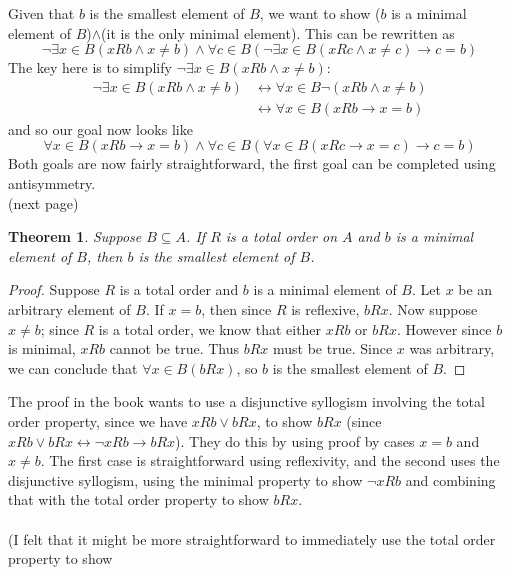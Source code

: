 \documentclass{report}
\newtheorem*{theorem}{Theorem}
\theoremstyle{definition}
\begin{document}
\noindent Given that $b$ is the smallest element of $B$, we want to show ($b$ is a minimal element of $B$)$\land$(it is the only minimal element). This can be rewritten as
\begin{equation*}
\neg\exists x\in B(xRb\land x\neq b)\land\forall c\in B(\neg\exists x\in B(xRc\land x\neq c)\to c=b)
\end{equation*}
The key here is to simplify $\neg\exists x\in B(xRb\land x\neq b)$:
\begin{align*}
\neg\exists x\in B(xRb\land x\neq b)&\leftrightarrow \forall x\in B\neg(xRb\land x\neq b)\\
&\leftrightarrow\forall x\in B(xRb\to x=b)
\end{align*}
and so our goal now looks like
\begin{equation*}
\forall x\in B(xRb\to x=b)\land\forall c\in B(\forall x\in B(xRc\to x=c)\to c=b)
\end{equation*}
Both goals are now fairly straightforward, the first goal can be completed using antisymmetry.\\
(next page)\newpage
\begin{theorem}
Suppose $B\subseteq A$. If $R$ is a total order on $A$ and $b$ is a minimal element of $B$, then $b$ is the smallest element of $B$. 
\end{theorem}
\begin{proof}
Suppose $R$ is a total order and $b$ is a minimal element of $B$. Let $x$ be an arbitrary element of $B$. If $x=b$, then since $R$ is reflexive, $bRx$. Now suppose $x\neq b$; since $R$ is a total
order, we know that either $xRb$ or $bRx$. However since $b$ is minimal, $xRb$ cannot be true. Thus
$bRx$ must be true. Since $x$ was arbitrary, we can conclude that $\forall x\in B(bRx)$, so $b$ is the smallest element of $B$.
\end{proof}
\noindent The proof in the book wants to use a disjunctive syllogism involving the total order property, since we have $xRb\lor bRx$, to show $bRx$ 
(since $xRb\lor bRx\leftrightarrow\neg xRb\to bRx$). They do this by using proof by cases $x=b$ and $x\neq b$. The first case is straightforward using reflexivity, and the second
uses the disjunctive syllogism, using the minimal property to show $\neg xRb$ and combining that with the total order property to show $bRx$.\\
\vspace{1mm}\\
(I felt that it might be more straightforward to immediately use the total order property to show 
\end{document}
